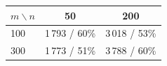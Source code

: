 \begin{tabular}{lcc}
\toprule
$m\backslash n$ & 50 & 200 \\
\midrule
100 & 1\,793 / 60\% & 3\,018 / 53\% \\
300 & 1\,773 / 51\% & 3\,788 / 60\% \\
\bottomrule
\end{tabular}
